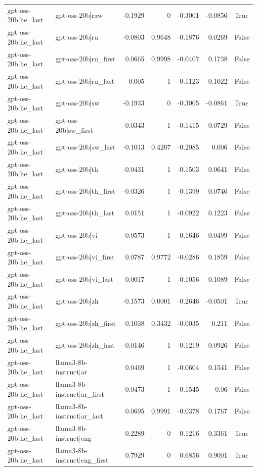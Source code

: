 \begin{table}
\begin{tabular}{l l r r r r l}
gpt-oss-20b|he_last & gpt-oss-20b|raw & -0.1929 & 0 & -0.3001 & -0.0856 & True \\
gpt-oss-20b|he_last & gpt-oss-20b|ru & -0.0803 & 0.9648 & -0.1876 & 0.0269 & False \\
gpt-oss-20b|he_last & gpt-oss-20b|ru_first & 0.0665 & 0.9998 & -0.0407 & 0.1738 & False \\
gpt-oss-20b|he_last & gpt-oss-20b|ru_last & -0.005 & 1 & -0.1123 & 0.1022 & False \\
gpt-oss-20b|he_last & gpt-oss-20b|sw & -0.1933 & 0 & -0.3005 & -0.0861 & True \\
gpt-oss-20b|he_last & gpt-oss-20b|sw_first & -0.0343 & 1 & -0.1415 & 0.0729 & False \\
gpt-oss-20b|he_last & gpt-oss-20b|sw_last & -0.1013 & 0.4207 & -0.2085 & 0.006 & False \\
gpt-oss-20b|he_last & gpt-oss-20b|th & -0.0431 & 1 & -0.1503 & 0.0641 & False \\
gpt-oss-20b|he_last & gpt-oss-20b|th_first & -0.0326 & 1 & -0.1399 & 0.0746 & False \\
gpt-oss-20b|he_last & gpt-oss-20b|th_last & 0.0151 & 1 & -0.0922 & 0.1223 & False \\
gpt-oss-20b|he_last & gpt-oss-20b|vi & -0.0573 & 1 & -0.1646 & 0.0499 & False \\
gpt-oss-20b|he_last & gpt-oss-20b|vi_first & 0.0787 & 0.9772 & -0.0286 & 0.1859 & False \\
gpt-oss-20b|he_last & gpt-oss-20b|vi_last & 0.0017 & 1 & -0.1056 & 0.1089 & False \\
gpt-oss-20b|he_last & gpt-oss-20b|zh & -0.1573 & 0.0001 & -0.2646 & -0.0501 & True \\
gpt-oss-20b|he_last & gpt-oss-20b|zh_first & 0.1038 & 0.3432 & -0.0035 & 0.211 & False \\
gpt-oss-20b|he_last & gpt-oss-20b|zh_last & -0.0146 & 1 & -0.1219 & 0.0926 & False \\
gpt-oss-20b|he_last & llama3-8b-instruct|ar & 0.0469 & 1 & -0.0604 & 0.1541 & False \\
gpt-oss-20b|he_last & llama3-8b-instruct|ar_first & -0.0473 & 1 & -0.1545 & 0.06 & False \\
gpt-oss-20b|he_last & llama3-8b-instruct|ar_last & 0.0695 & 0.9991 & -0.0378 & 0.1767 & False \\
gpt-oss-20b|he_last & llama3-8b-instruct|eng & 0.2289 & 0 & 0.1216 & 0.3361 & True \\
gpt-oss-20b|he_last & llama3-8b-instruct|eng_first & 0.7929 & 0 & 0.6856 & 0.9001 & True \\

\end{tabular}
\end{table}
